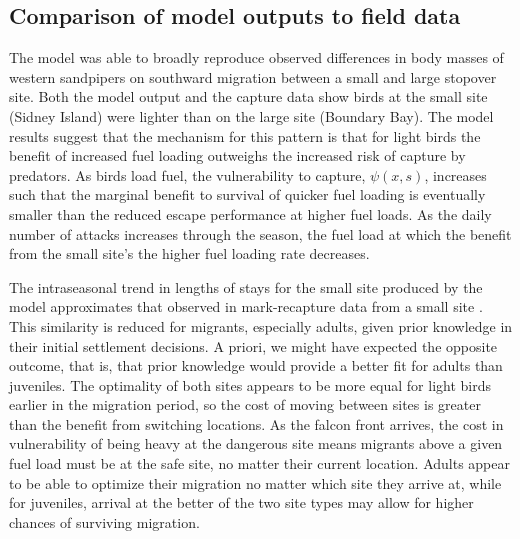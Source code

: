 \subsection*{Comparison of model outputs to field data}

The model was able to broadly reproduce observed differences in body masses of western sandpipers on southward migration between a small and large stopover site. Both the model output and the capture data show birds at the small site (Sidney Island) were lighter than on the large site (Boundary Bay). The model results suggest that the mechanism for this pattern is that for light birds the benefit of increased fuel loading outweighs the increased risk of capture by predators. As birds load fuel, the vulnerability to capture, $\psi(x,s)$, increases such that the marginal benefit to survival of quicker fuel loading is eventually smaller than the reduced escape performance at higher fuel loads. As the daily number of attacks increases through the season, the fuel load at which the benefit from the small site's the higher fuel loading rate decreases. %

The intraseasonal trend in lengths of stays for the small site produced by the model approximates that observed in mark-recapture data from a small site \citep{Hope2011}. This similarity is reduced for migrants, especially adults, given prior knowledge in their initial settlement decisions. A priori, we might have expected the opposite outcome, that is, that prior knowledge would provide a better fit for adults than juveniles. The optimality of both sites appears to be more equal for light birds earlier in the migration period, so the cost of moving between sites is greater than the benefit from switching locations. As the falcon front arrives, the cost in vulnerability of being heavy at the dangerous site means migrants above a given fuel load must be at the safe site, no matter their current location. Adults appear to be able to optimize their migration no matter which site they arrive at, while for juveniles, arrival at the better of the two site types may allow for higher chances of surviving migration.


